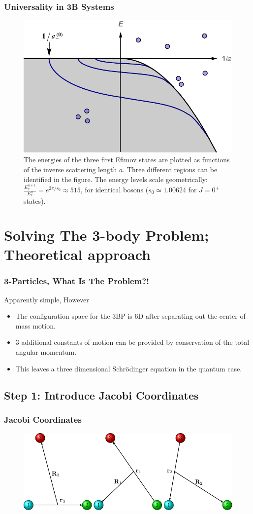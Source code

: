\documentclass[hideothersubsections]{beamer}
\begin{document}
\begin{frame}
\frametitle{Universality in 3B Systems}
\begin{figure}
	\centering
	\includegraphics[width=0.5\linewidth]{efimov_spec}
	\caption{The energies of the three first Efimov states are plotted as functions of the inverse scattering length $a$. Three different regions can be identified in the figure.	The energy levels scale geometrically: $\frac{E_T^{n+1}}{E_T^{n}} = e^{2\pi/s_0} \approx 515$, for identical bosons ($s_0 \simeq 1.00624$ for $J=0^+$ states).}
\end{figure} 
\end{frame}

\section{Solving The 3-body Problem; Theoretical approach}
\begin{frame}
\frametitle{3-Particles, What Is The Problem?!}
\begin{block}{Apparently simple, However}
	\begin{itemize}
	\item The configuration space for the 3BP is 6D after separating out the center of mass motion.
	\item 3 additional constants of motion can be provided by conservation of the total angular momentum.
	\item This leaves a three dimensional Schr{\"o}dinger equation in the quantum case.
	\end{itemize}
\end{block}
\end{frame}

\subsection{Step 1: Introduce Jacobi Coordinates}
\begin{frame}
\frametitle{Jacobi Coordinates}
\begin{figure}
\centering
\includegraphics[width=0.7\linewidth]{jacobi.pdf}
\end{figure}
\end{frame}
\end{document}
